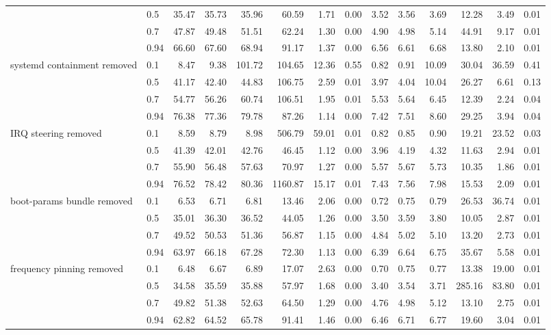\begin{table}
{\begin{tabular}{llrrrrrrrrrrrr}
 & 0.5 & 35.47 & 35.73 & 35.96 & 60.59 & 1.71 & 0.00 & 3.52 & 3.56 & 3.69 & 12.28 & 3.49 & 0.01 \\
 & 0.7 & 47.87 & 49.48 & 51.51 & 62.24 & 1.30 & 0.00 & 4.90 & 4.98 & 5.14 & 44.91 & 9.17 & 0.01 \\
 & 0.94 & 66.60 & 67.60 & 68.94 & 91.17 & 1.37 & 0.00 & 6.56 & 6.61 & 6.68 & 13.80 & 2.10 & 0.01 \\
\cmidrule{1-14}
\multirow[t]{4}{*}{systemd containment removed} & 0.1 & 8.47 & 9.38 & 101.72 & 104.65 & 12.36 & 0.55 & 0.82 & 0.91 & 10.09 & 30.04 & 36.59 & 0.41 \\
 & 0.5 & 41.17 & 42.40 & 44.83 & 106.75 & 2.59 & 0.01 & 3.97 & 4.04 & 10.04 & 26.27 & 6.61 & 0.13 \\
 & 0.7 & 54.77 & 56.26 & 60.74 & 106.51 & 1.95 & 0.01 & 5.53 & 5.64 & 6.45 & 12.39 & 2.24 & 0.04 \\
 & 0.94 & 76.38 & 77.36 & 79.78 & 87.26 & 1.14 & 0.00 & 7.42 & 7.51 & 8.60 & 29.25 & 3.94 & 0.04 \\
\cmidrule{1-14}
\multirow[t]{4}{*}{IRQ steering removed} & 0.1 & 8.59 & 8.79 & 8.98 & 506.79 & 59.01 & 0.01 & 0.82 & 0.85 & 0.90 & 19.21 & 23.52 & 0.03 \\
 & 0.5 & 41.39 & 42.01 & 42.76 & 46.45 & 1.12 & 0.00 & 3.96 & 4.19 & 4.32 & 11.63 & 2.94 & 0.01 \\
 & 0.7 & 55.90 & 56.48 & 57.63 & 70.97 & 1.27 & 0.00 & 5.57 & 5.67 & 5.73 & 10.35 & 1.86 & 0.01 \\
 & 0.94 & 76.52 & 78.42 & 80.36 & 1160.87 & 15.17 & 0.01 & 7.43 & 7.56 & 7.98 & 15.53 & 2.09 & 0.01 \\
\cmidrule{1-14}
\multirow[t]{4}{*}{boot-params bundle removed} & 0.1 & 6.53 & 6.71 & 6.81 & 13.46 & 2.06 & 0.00 & 0.72 & 0.75 & 0.79 & 26.53 & 36.74 & 0.01 \\
 & 0.5 & 35.01 & 36.30 & 36.52 & 44.05 & 1.26 & 0.00 & 3.50 & 3.59 & 3.80 & 10.05 & 2.87 & 0.01 \\
 & 0.7 & 49.52 & 50.53 & 51.36 & 56.87 & 1.15 & 0.00 & 4.84 & 5.02 & 5.10 & 13.20 & 2.73 & 0.01 \\
 & 0.94 & 63.97 & 66.18 & 67.28 & 72.30 & 1.13 & 0.00 & 6.39 & 6.64 & 6.75 & 35.67 & 5.58 & 0.01 \\
\cmidrule{1-14}
\multirow[t]{4}{*}{frequency pinning removed} & 0.1 & 6.48 & 6.67 & 6.89 & 17.07 & 2.63 & 0.00 & 0.70 & 0.75 & 0.77 & 13.38 & 19.00 & 0.01 \\
 & 0.5 & 34.58 & 35.59 & 35.88 & 57.97 & 1.68 & 0.00 & 3.40 & 3.54 & 3.71 & 285.16 & 83.80 & 0.01 \\
 & 0.7 & 49.82 & 51.38 & 52.63 & 64.50 & 1.29 & 0.00 & 4.76 & 4.98 & 5.12 & 13.10 & 2.75 & 0.01 \\
 & 0.94 & 62.82 & 64.52 & 65.78 & 91.41 & 1.46 & 0.00 & 6.46 & 6.71 & 6.77 & 19.60 & 3.04 & 0.01 \\
\cmidrule{1-14}
\bottomrule
\end{tabular}%
}
\end{table}
